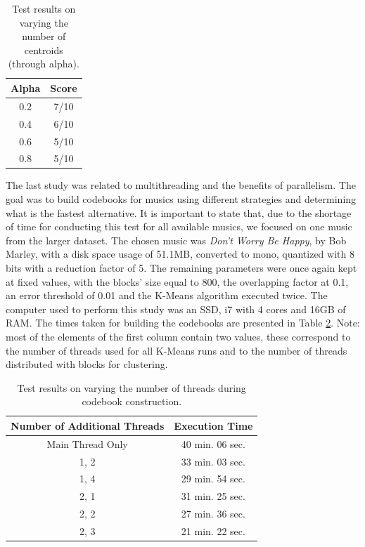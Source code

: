 \documentclass[12pt]{article}
\begin{document}
\begin{table}[H]
  \begin{center}
    \begin{tabular}{c|c}
      \textbf{Alpha} & \textbf{Score}\\
      \hline
      0.2 & 7/10\\
      0.4 & 6/10\\
      0.6 & 5/10\\
      0.8 & 5/10\\
    \end{tabular}
  \end{center}
  \caption{Test results on varying the number of centroids (through alpha).}
  \label{tab:numcentroids}
\end{table}

The last study was related to multithreading and the benefits of parallelism.
The goal was to build codebooks for musics using different strategies and
determining what is the fastest alternative.
It is important to state that, due to the shortage of time for conducting this 
test for all available musics, we focused on one music from the larger dataset.
The chosen music was {\it Don't Worry Be Happy\/}, by Bob Marley, with a disk 
space usage of 51.1MB, converted to mono, quantized with 8 bits with a reduction 
factor of 5.
The remaining parameters were once again kept at fixed values, with the blocks'
size equal to 800, the overlapping factor at 0.1, an error threshold of 0.01 and
the K-Means algorithm executed twice.
The computer used to perform this study was an SSD, i7 with 4 cores and 16GB of RAM.
The times taken for building the codebooks are presented in Table \ref{tab:multithreading}.
Note: most of the elements of the first column contain two values, these 
correspond to the number of threads used for all K-Means runs and to the number
of threads distributed with blocks for clustering.

\begin{table}[H]
  \begin{center}
    \begin{tabular}{c|c}
      \textbf{Number of Additional Threads} & \textbf{Execution Time}\\
      \hline
      Main Thread Only & 40 min. 06 sec.\\
      1, 2 & 33 min. 03 sec.\\
      1, 4 & 29 min. 54 sec.\\
      2, 1 & 31 min. 25 sec.\\
      2, 2 & 27 min. 36 sec.\\
      2, 3 & 21 min. 22 sec.\\
    \end{tabular}
  \end{center}
  \caption{Test results on varying the number of threads during codebook construction.}
  \label{tab:multithreading}
\end{table}
\end{document}
